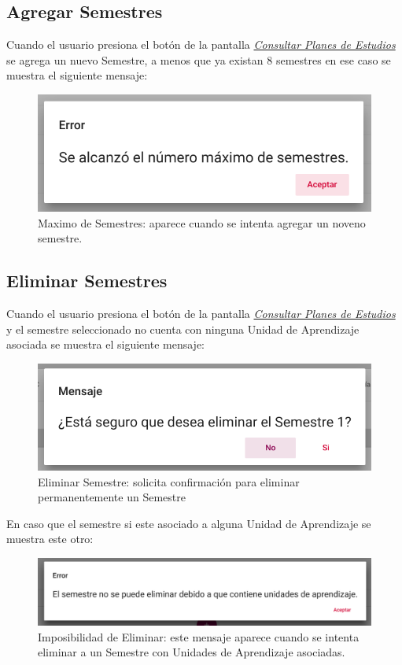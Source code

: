 \subsection{Agregar Semestres}
Cuando el usuario presiona el botón \IUbutton{+} de la pantalla \hyperlink{consultarS}{\textit{Consultar Planes de Estudios}} se agrega un nuevo Semestre, a menos que ya existan 8 semestres en ese caso se muestra el siguiente mensaje:
\begin{figure}[H]
    \centering
    \hypertarget{maxSemestres}{\includegraphics[width=0.7\linewidth]{images/GUA/maxSemestres}}
    \caption{Maximo de Semestres: aparece cuando se intenta agregar un noveno semestre.}
    \label{maxSemestres}
\end{figure}
\subsection{Eliminar Semestres}
Cuando el usuario presiona el botón  de la pantalla \hyperlink{consultarS}{\textit{Consultar Planes de Estudios}} y el semestre seleccionado no cuenta con ninguna Unidad de Aprendizaje asociada se muestra el siguiente mensaje:
\begin{figure}[H]
    \centering
    \hypertarget{eliminarS}{\includegraphics[width=0.7\linewidth]{images/GUA/eliminarS}}
    \caption{Eliminar Semestre: solicita confirmación para eliminar permanentemente un Semestre}
    \label{eliminarS}
\end{figure}
En caso que el semestre si este asociado a alguna Unidad de Aprendizaje se muestra este otro:
\begin{figure}[H]
    \centering
    \hypertarget{errorEliminarS}{\includegraphics[width=0.7\linewidth]{images/GUA/errorEliminarS}}
    \caption{Imposibilidad de Eliminar: este mensaje aparece cuando se intenta eliminar a un Semestre con Unidades de Aprendizaje asociadas.}
    \label{errorEliminarS}
\end{figure}
\newpage
